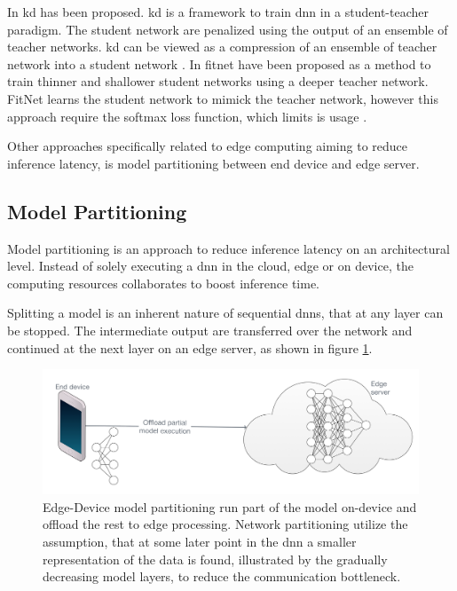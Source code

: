 In \cite{hinton_distilling_2015} \gls{kd} has been proposed. \gls{kd} is a framework to train \gls{dnn} in a student-teacher paradigm. The student network are penalized using the output of an ensemble of teacher networks. \gls{kd} can be viewed as a compression of an ensemble of teacher network into a student network \cite{cheng_survey_2017}. 
In \cite{romero_fitnets:_2014} \gls{fitnet} have been proposed as a method to train thinner and shallower student networks using a deeper teacher network. FitNet learns the student network to mimick the teacher network, however this approach require the softmax loss function, which limits is usage \cite{cheng_survey_2017}.  

Other approaches specifically related to edge computing aiming to reduce inference latency, is model partitioning between end device and edge server. 

\subsection{Model Partitioning}

Model partitioning is an approach to reduce inference latency on an architectural level. Instead of solely executing a \gls{dnn} in the cloud, edge or on device, the computing resources collaborates to boost inference time. 

Splitting a model is an inherent nature of sequential \gls{dnn}s, that at any layer can be stopped. The intermediate output are transferred over the network and continued at the next layer on an edge server, as shown in figure \ref{fig:offlaoding}.

\begin{figure}
	\centering
	\includegraphics[width=\linewidth]{figures/models/partitioning}
	\caption[Model partitioning]{Edge-Device model partitioning run part of the model on-device and offload the rest to edge processing. Network partitioning utilize the assumption, that at some later point in the \gls{dnn} a smaller representation of the data is found, illustrated by the gradually decreasing model layers, to reduce the communication bottleneck. }
	\label{fig:offlaoding}
\end{figure}

